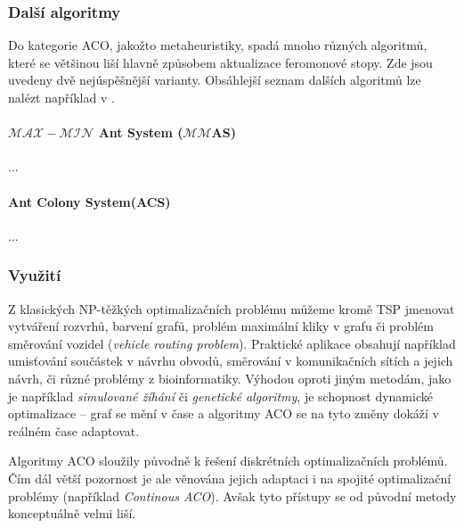 \documentclass[a4paper,12pt]{article}
\begin{document}



\subsubsection{Další algoritmy}
Do kategorie ACO, jakožto metaheuristiky, spadá mnoho různých algoritmů, které se většinou liší hlavně způsobem aktualizace feromonové stopy. Zde jsou uvedeny dvě nejúspěšnější varianty. Obsáhlejší seznam dalších algoritmů
lze nalézt například v \cite{Dorigo06antcolony}.

\paragraph{$\mathcal{MAX-MIN}$ Ant System ($\mathcal{MM}$AS)} {...}
\paragraph{Ant Colony System(ACS)} {...}


\subsubsection{Využití}
Z klasických NP-těžkých optimalizačních problému můžeme kromě TSP jmenovat vytváření rozvrhů,
barvení grafů, problém maximální kliky v grafu či problém směrování vozidel ({\it vehicle routing problem}).
Praktické aplikace obsahují například
umisťování součástek v návrhu obvodů, směrování v komunikačních sítích a jejich návrh, či různé problémy
z bioinformatiky.
Výhodou oproti jiným metodám, jako je například {\it simulované žíhání} či {\it genetické algoritmy}, je
schopnost dynamické optimalizace -- graf se mění v čase a algoritmy ACO se na tyto změny dokáží v reálném
čase adaptovat.

Algoritmy ACO sloužily původně k řešení diskrétních optimalizačních problémů. Čím dál větší pozornost je
ale věnována jejich adaptaci i na spojité optimalizační problémy (například {\it Continous ACO}).
Avšak tyto přístupy se od původní metody konceptuálně velmi liší.
\end{document}

